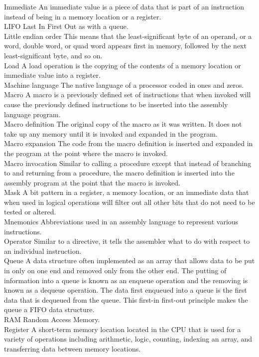 \documentclass[10pt]{article}
\begin{document}
Immediate An immediate value is a piece of data that is part of an instruction instead of being in a memory location or a register.\\
LIFO Last In First Out as with a queue.\\
Little endian order This means that the least-significant byte of an operand, or a word, double word, or quad word appears first in memory, followed by the next least-significant byte, and so on.\\
Load A load operation is the copying of the contents of a memory location or immediate value into a register.\\
Machine language The native language of a processor coded in ones and zeros. Macro A macro is a previously defined set of instructions that when invoked will cause the previously defined instructions to be inserted into the assembly language program.\\
Macro definition The original copy of the macro as it was written. It does not take up any memory until it is invoked and expanded in the program.\\
Macro expansion The code from the macro definition is inserted and expanded in the program at the point where the macro is invoked.\\
Macro invocation Similar to calling a procedure except that instead of branching to and returning from a procedure, the macro definition is inserted into the assembly program at the point that the macro is invoked.\\
Mask A bit pattern in a register, a memory location, or an immediate data that when used in logical operations will filter out all other bits that do not need to be tested or altered.\\
Mnemonics Abbreviations used in an assembly language to represent various instructions.\\
Operator Similar to a directive, it tells the assembler what to do with respect to an individual instruction.\\
Queue A data structure often implemented as an array that allows data to be put in only on one end and removed only from the other end. The putting of information into a queue is known as an enqueue operation and the removing is known as a dequeue operation. The data first enqueued into a queue is the first data that is dequeued from the queue. This first-in first-out principle makes the queue a FIFO data structure.\\
RAM Random Access Memory.\\
Register A short-term memory location located in the CPU that is used for a variety of operations including arithmetic, logic, counting, indexing an array, and transferring data between memory locations.\\
\end{document}
